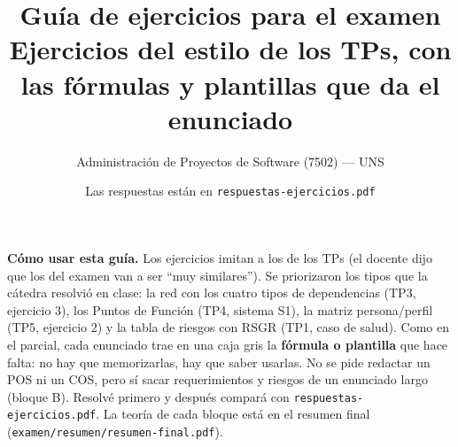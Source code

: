 \documentclass[11pt,a4paper]{article}
\title{\vspace{-1.6cm}\textbf{Guía de ejercicios para el examen}\\[4pt]
\large Ejercicios del estilo de los TPs, con las fórmulas y plantillas que da el enunciado}
\author{\normalsize Administración de Proyectos de Software (7502) --- UNS}
\date{\normalsize Las respuestas están en \texttt{respuestas-ejercicios.pdf}}
\begin{document}
\maketitle
\thispagestyle{empty}

\begin{yavisto}
\textbf{Cómo usar esta guía.} Los ejercicios imitan a los de los TPs (el docente dijo que los del examen van a
ser ``muy similares''). Se priorizaron los tipos que la cátedra resolvió en clase: la red con los cuatro tipos
de dependencias (TP3, ejercicio 3), los Puntos de Función (TP4, sistema S1), la matriz persona/perfil (TP5,
ejercicio 2) y la tabla de riesgos con RSGR (TP1, caso de salud). Como en el parcial, cada enunciado trae en una
caja gris la \textbf{fórmula o plantilla} que hace falta: no hay que memorizarlas, hay que saber usarlas. No se
pide redactar un POS ni un COS, pero sí sacar requerimientos y riesgos de un enunciado largo (bloque B).
Resolvé primero y después compará con \texttt{respuestas-ejercicios.pdf}. La teoría de cada bloque está en el
resumen final (\texttt{examen/resumen/resumen-final.pdf}).
\end{yavisto}

\tableofcontents
\newpage

\end{document}
